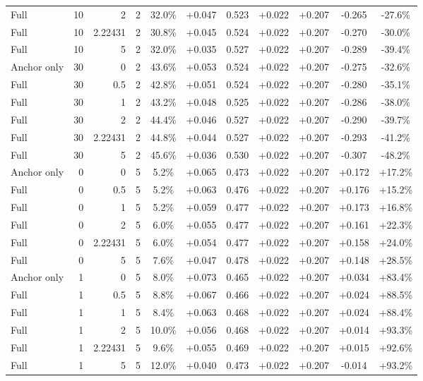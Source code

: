 \begin{table}[htbp]
\begin{tabular}{lrrrccccccc}
Full & 10 & 2 & 2 & 32.0\% & +0.047 & 0.523 & +0.022 & +0.207 & -0.265 & -27.6\% \\
Full & 10 & 2.22431 & 2 & 30.8\% & +0.045 & 0.524 & +0.022 & +0.207 & -0.270 & -30.0\% \\
Full & 10 & 5 & 2 & 32.0\% & +0.035 & 0.527 & +0.022 & +0.207 & -0.289 & -39.4\% \\
Anchor only & 30 & 0 & 2 & 43.6\% & +0.053 & 0.524 & +0.022 & +0.207 & -0.275 & -32.6\% \\
Full & 30 & 0.5 & 2 & 42.8\% & +0.051 & 0.524 & +0.022 & +0.207 & -0.280 & -35.1\% \\
Full & 30 & 1 & 2 & 43.2\% & +0.048 & 0.525 & +0.022 & +0.207 & -0.286 & -38.0\% \\
Full & 30 & 2 & 2 & 44.4\% & +0.046 & 0.527 & +0.022 & +0.207 & -0.290 & -39.7\% \\
Full & 30 & 2.22431 & 2 & 44.8\% & +0.044 & 0.527 & +0.022 & +0.207 & -0.293 & -41.2\% \\
Full & 30 & 5 & 2 & 45.6\% & +0.036 & 0.530 & +0.022 & +0.207 & -0.307 & -48.2\% \\
Anchor only & 0 & 0 & 5 & 5.2\% & +0.065 & 0.473 & +0.022 & +0.207 & +0.172 & +17.2\% \\
Full & 0 & 0.5 & 5 & 5.2\% & +0.063 & 0.476 & +0.022 & +0.207 & +0.176 & +15.2\% \\
Full & 0 & 1 & 5 & 5.2\% & +0.059 & 0.477 & +0.022 & +0.207 & +0.173 & +16.8\% \\
Full & 0 & 2 & 5 & 6.0\% & +0.055 & 0.477 & +0.022 & +0.207 & +0.161 & +22.3\% \\
Full & 0 & 2.22431 & 5 & 6.0\% & +0.054 & 0.477 & +0.022 & +0.207 & +0.158 & +24.0\% \\
Full & 0 & 5 & 5 & 7.6\% & +0.047 & 0.478 & +0.022 & +0.207 & +0.148 & +28.5\% \\
Anchor only & 1 & 0 & 5 & 8.0\% & +0.073 & 0.465 & +0.022 & +0.207 & +0.034 & +83.4\% \\
Full & 1 & 0.5 & 5 & 8.8\% & +0.067 & 0.466 & +0.022 & +0.207 & +0.024 & +88.5\% \\
Full & 1 & 1 & 5 & 8.4\% & +0.063 & 0.468 & +0.022 & +0.207 & +0.024 & +88.4\% \\
Full & 1 & 2 & 5 & 10.0\% & +0.056 & 0.468 & +0.022 & +0.207 & +0.014 & +93.3\% \\
Full & 1 & 2.22431 & 5 & 9.6\% & +0.055 & 0.469 & +0.022 & +0.207 & +0.015 & +92.6\% \\
Full & 1 & 5 & 5 & 12.0\% & +0.040 & 0.473 & +0.022 & +0.207 & -0.014 & +93.2\% \\

\end{tabular}
\end{table}
